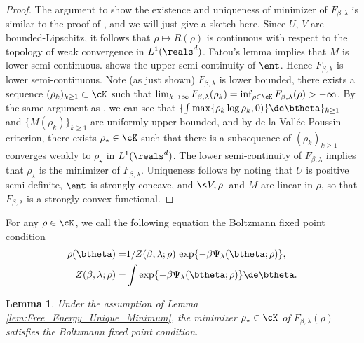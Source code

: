 \documentclass[11pt]{article}
\newtheorem{lemma}{Lemma}
\begin{document}
\begin{proof}
The argument to show the existence and uniqueness of minimizer of
$F_{\beta, \lambda}$ is similar to the proof of \cite[Proposition 4.1]{jordan1998variational}, and we will just give a sketch here. Since $U$, $V$ are  bounded-Lipschitz,
 it follows that $\rho\mapsto R(\rho)$  is continuous with respect to the topology of weak convergence in $L^1(\reals^d)$. Fatou's lemma implies that $M$ is lower semi-continuous. 
\cite[Proposition 4.1]{jordan1998variational} shows the upper semi-continuity of $\ent$. Hence $F_{\beta, \lambda}$ is lower semi-continuous.
Note (as just shown)  $F_{\beta, \lambda}$ is lower bounded, there exists a sequence $( \rho_k )_{k \ge 1} \subset \cK$ such that $\lim_{k \to\infty}F_{\beta, \lambda}(\rho_k) = \inf_{\rho \in \cK} F_{\beta, \lambda}(\rho) > -\infty$. By the same argument as \cite[Proposition 4.1]{jordan1998variational}, we can see that $\{ \int \max\{\rho_k \log \rho_k, 0) \} \de \btheta\}_{k \ge 1}$ and $\{M(\rho_k)\}_{k \ge 1}$ are uniformly upper bounded, and by de la Vall\'ee-Poussin criterion, there exists $\rho_\star \in \cK$ such that there is a subsequence of $(\rho_k)_{k \ge 1}$ converges weakly to $\rho_\star$ in $L^1(\reals^d)$. The lower semi-continuity of $F_{\beta, \lambda}$ implies that $\rho_\star$ is the minimizer of $F_{\beta, \lambda}$. Uniqueness follows by noting that $U$ is positive semi-definite, $\ent$ is strongly concave, and $\< V, \rho\>$ and $M$ are linear in $\rho$, so that $F_{\beta, \lambda}$ is a strongly convex functional. 

\end{proof}

For any $\rho \in \cK$, we call the following equation the Boltzmann fixed point condition
\begin{equation}\label{eqn:BoltzmannEquation_in_proof}
\begin{aligned}
\rho(\btheta) =& 1/Z(\beta, \lambda; \rho) \, \exp\{ - \beta \Psi_\lambda(\btheta; \rho) \},\\
Z(\beta, \lambda; \rho) =& \int  \exp\{ - \beta \Psi_\lambda(\btheta; \rho) \} \de \btheta. 
\end{aligned}
\end{equation}


\begin{lemma}
Under the assumption of Lemma \ref{lem:Free_Energy_Unique_Minimum}, the minimizer $\rho_\star \in \cK$ of 
$F_{\beta, \lambda}(\rho)$ satisfies the Boltzmann fixed point condition. 
\end{lemma}
\end{document}
